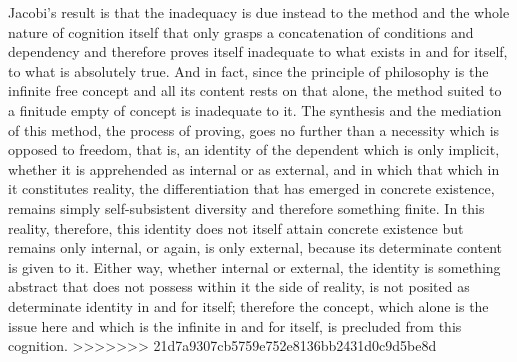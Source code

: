 Jacobi's result is that the inadequacy is
due instead to the method
and the whole nature of cognition itself
that only grasps a concatenation of
conditions and dependency
and therefore proves itself inadequate
to what exists in and for itself,
to what is absolutely true.
And in fact, since the principle of philosophy is
the infinite free concept
and all its content rests on that alone,
the method suited to a finitude empty of concept is
inadequate to it.
The synthesis and the mediation of this method,
the process of proving, goes no further than a
necessity which is opposed to freedom,
that is, an identity of the dependent
which is only implicit,
whether it is apprehended as internal or as external,
and in which that which in it constitutes reality,
the differentiation that has emerged in concrete existence,
remains simply self-subsistent diversity
and therefore something finite.
In this reality, therefore, this identity does
not itself attain concrete existence
but remains only internal,
or again, is only external,
because its determinate content is given to it.
Either way, whether internal or external,
the identity is something abstract
that does not possess within it the side of reality,
is not posited as determinate
identity in and for itself;
therefore the concept,
which alone is the issue here
and which is the infinite
in and for itself,
is precluded from this cognition.
>>>>>>> 21d7a9307cb5759e752e8136bb2431d0c9d5be8d

